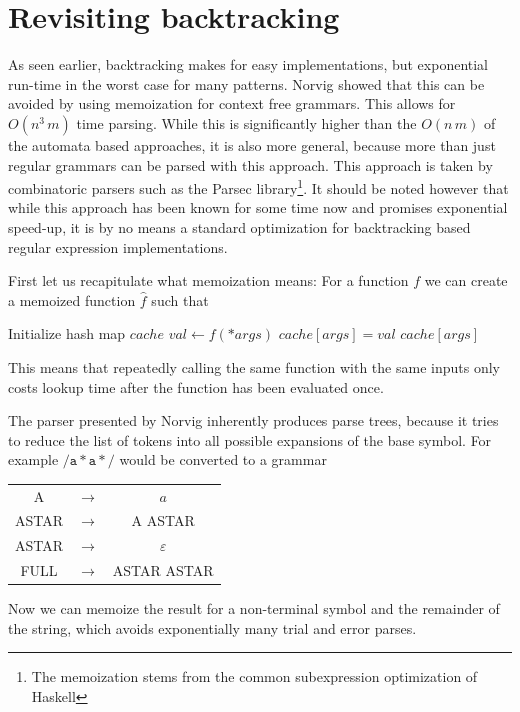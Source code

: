 \documentclass[11pt,a4paper,twoside,openright]{Thesis}
\theoremstyle{definition}
\newcommand{\regex}[1]{\ensuremath{\mathtt{/#1/}}}
\newcommand{\seclabel}[1]{\label{sec:#1}}
\begin{document}
\section{Revisiting backtracking}\seclabel{revise-backtrack}
As seen earlier, backtracking makes for easy implementations, but exponential
run-time in the worst case for many patterns. Norvig\cite{Norv91a} showed that
this can be avoided by using memoization for context free grammars.  This
allows for $O(n^3\, m)$ time parsing. While this is significantly higher than
the $O(n\, m)$ of the automata based approaches, it is also more general,
because more than just regular grammars can be parsed with this approach.  This
approach is taken by combinatoric parsers such as the Parsec
library\footnote{The memoization stems from the common subexpression
optimization of Haskell}.  It should be noted however that while this
approach has been known for some time now and promises exponential
speed-up, it is by no means a standard optimization for backtracking based
regular expression implementations.

First let us recapitulate what memoization means: For a function $f$ we can
create a memoized function $\hat f$ such that
\begin{algorithmic}
  \State Initialize hash map $cache$
  \State $val\leftarrow f(*args)$
  \State $cache[args] = val$
  \EndIf
  \State \Return $cache[args]$
  \EndFunction
\end{algorithmic}
This means that repeatedly calling the same function with  the same inputs
only costs lookup time after the function has been evaluated once.

The parser presented by Norvig inherently produces parse trees, because it
tries to reduce the list of tokens into all possible expansions of the base
symbol. For example \regex{a*a*} would be converted to a grammar

\begin{center}
\begin{tabular}{ccc}
A& $\rightarrow$ & $a$\\
ASTAR & $\rightarrow$ & A ASTAR \\
ASTAR & $\rightarrow$ & $\varepsilon$ \\
FULL & $\rightarrow$ & ASTAR ASTAR \\
\end{tabular}
\end{center}

Now we can memoize the result for a non-terminal symbol and the remainder of
the string, which avoids exponentially many trial and error parses.
\end{document}
